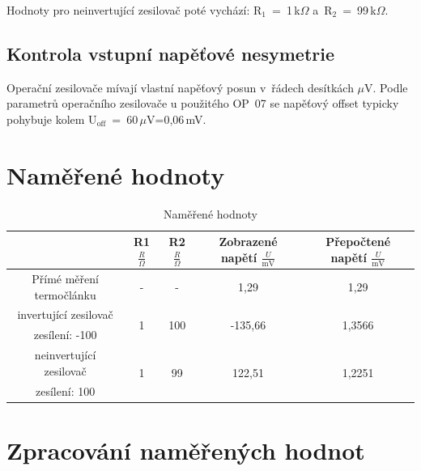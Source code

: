 \documentclass[a4paper,12pt]{article}   %
\newcommand{\sub}[1]{$_\textrm{#1}$}
\newcommand{\kR}{k$\Omega$}
\begin{document}
Hodnoty pro neinvertující zesilovač poté vychází: R\sub{1}~=~1\,k$\Omega$ a~R\sub{2}~=~99\,\kR.
\subsection{Kontrola vstupní napěťové nesymetrie}
Operační zesilovače mívají vlastní napěťový posun v~řádech desítkách $\mu$V. Podle parametrů operačního zesilovače u použitého OP~07 se napěťový offset typicky pohybuje kolem U\sub{off}~=~60\,$\mu$V=0,06\,mV.

\section{Naměřené hodnoty}
\begin{table}[h!]
    \centering
    \begin{tabular}{|c|c|c|c|c|}
        \hline
        \rule{0pt}{2.5ex}
        & R1 $\frac{R}{\Omega}$ & R2 $\frac{R}{\Omega}$ & Zobrazené napětí $\frac{U}{\textrm{mV}}$ & Přepočtené napětí $\frac{U}{\textrm{mV}}$\\[.7ex] \hline\hline
        Přímé měření termočlánku & - & - & 1,29 & 1,29\\\hline
        invertující zesilovač & \multirow{2}{*}{1} & \multirow{2}{*}{100} & \multirow{2}{*}{-135,66} &\multirow{2}{*}{1,3566}\\
        zesílení: -100 & & & &\\\hline
        neinvertující zesilovač & \multirow{2}{*}{1} & \multirow{2}{*}{99} & \multirow{2}{*}{122,51} &\multirow{2}{*}{1,2251}\\
        zesílení: 100 & & & &\\\hline
    \end{tabular}
    \caption{Naměřené hodnoty}
    \label{tab:hodnoty}
\end{table}


\section{Zpracování naměřených hodnot}
\end{document}
